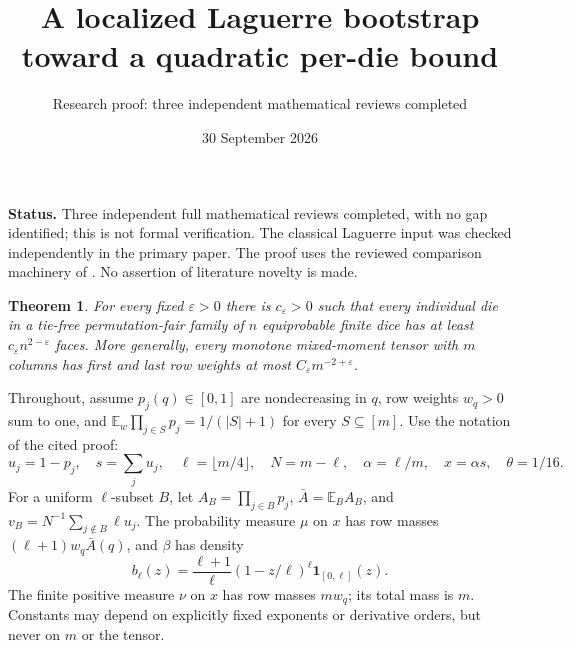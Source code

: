 \documentclass[11pt]{article}
\title{A localized Laguerre bootstrap toward a quadratic per-die bound}
\author{Research proof: three independent mathematical reviews completed}
\date{30 September 2026}
\newtheorem{theorem}{Theorem}
\newcommand{\E}{\mathbb E}
\begin{document}
\maketitle
\noindent\textbf{Status.} Three independent full mathematical reviews
completed, with no gap identified; this is not formal verification.
The classical Laguerre input was checked independently in the primary
paper. The proof uses the reviewed comparison machinery of
.
No assertion of literature novelty is made.

\begin{theorem}\label{main}
For every fixed $\varepsilon>0$ there is $c_\varepsilon>0$ such that
every individual die in a tie-free permutation-fair family of $n$
equiprobable finite dice has at least $c_\varepsilon n^{2-\varepsilon}$
faces. More generally, every monotone mixed-moment tensor with $m$
columns has first and last row weights at most
$C_\varepsilon m^{-2+\varepsilon}$.
\end{theorem}

Throughout, assume $p_j(q)\in[0,1]$ are nondecreasing in $q$, row weights
$w_q>0$ sum to one, and
$\E_w\prod_{j\in S}p_j=1/(|S|+1)$ for every $S\subseteq[m]$.
Use the notation of the cited proof:
\[
 u_j=1-p_j,\quad s=\sum_j u_j,\quad
 \ell=\lfloor m/4\rfloor,\quad N=m-\ell,\quad
 \alpha=\ell/m,\quad x=\alpha s,\quad\theta=1/16.
\]
For a uniform $\ell$-subset $B$, let
$A_B=\prod_{j\in B}p_j$, $\bar A=\E_BA_B$, and
$v_B=N^{-1}\sum_{j\notin B}\ell u_j$.
The probability measure $\mu$ on $x$ has row masses
$(\ell+1)w_q\bar A(q)$, and $\beta$ has density
\[
 b_\ell(z)=\frac{\ell+1}{\ell}(1-z/\ell)^\ell
                 \boldsymbol1_{[0,\ell]}(z).
\]
The finite positive measure $\nu$ on $x$ has row masses $mw_q$;
its total mass is $m$. Constants may depend on explicitly fixed
exponents or derivative orders, but never on $m$ or the tensor.
\end{document}

